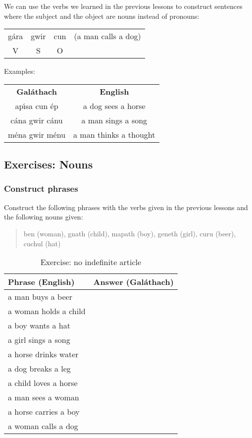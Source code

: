 We can use the verbs we learned in the previous lessons to construct sentences where the subject and the object are nouns instead of pronouns:
\begin{table}[H]
\begin{tabular}{cccc}
  g\'{a}ra & gwir & cun & (a man calls a dog)\\
  V & S & O &
\end{tabular}
\label{examples_vso}
\end{table}

Examples:
\begin{table}[H]
\centering
\begin{tabular}{cc}
  \toprule
  \textbf{Gal\'{a}thach} & \textbf{English}\\
  \cmidrule(lr){1-1}\cmidrule(lr){2-2}
  ap\'{\i}sa cun \'{e}p & a dog sees a horse\\
  c\'{a}na gwir c\'{a}nu & a man sings a song\\
  m\'{e}na gwir m\'{e}nu & a man thinks a thought\\
  \bottomrule
\end{tabular}
\label{examples_vso_more_examples}
\end{table}

\newpage
\subsection{Exercises: Nouns}

\subsubsection{Construct phrases}

Construct the following phrases with the verbs given in the previous lessons and the following nouns given:

\begin{quote}
ben (woman), gnath (child), mapath (boy), geneth (girl), curu (beer), cuchul (hat)
\end{quote}

\begin{table}[H]
\centering
\begin{tabular}{|l|M{10.0cm}|}
  \toprule
  \textbf{Phrase (English)} & \textbf{Answer (Gal\'{a}thach)}\\
  \toprule
  a man buys a beer & \\
  \midrule
  a woman holds a child & \\
  \midrule
  a boy wants a hat & \\
  \midrule
  a girl sings a song & \\
  \midrule
  a horse drinks water & \\
  \midrule
  a dog breaks a leg & \\
  \midrule
  a child loves a horse & \\
  \midrule
  a man sees a woman & \\
  \midrule
  a horse carries a boy & \\
  \midrule
  a woman calls a dog & \\
  \bottomrule
\end{tabular}
\label{exercise_no_indefinite_article}
\caption{Exercise: no indefinite article}
\end{table}

